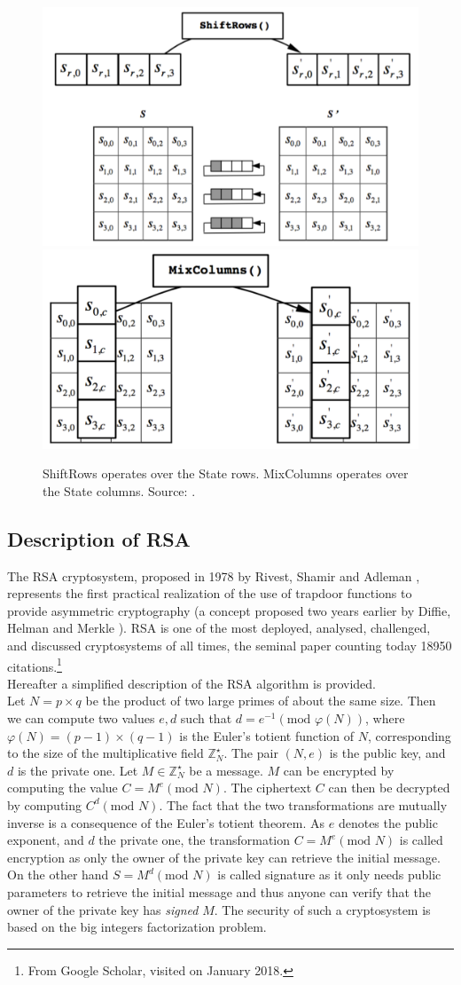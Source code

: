 \begin{figure}
\centering
\includegraphics[width = .45\textwidth]{../Figures/FISP_AES/shift_rows.pdf} 
\includegraphics[width = .45\textwidth]{../Figures/FISP_AES/mix_columns.pdf} 
\caption[ShiftRows and MixColumns.]{ShiftRows operates over the State rows. MixColumns operates over the State columns. Source: \cite{nist197}.}\label{fig:AES_sbox}
\end{figure}

\subsection{Description of RSA}
The RSA cryptosystem, proposed in 1978 by Rivest, Shamir and Adleman \cite{rivest1978method}, represents the first practical realization of the use of trapdoor functions to provide asymmetric cryptography (a concept proposed two years earlier by Diffie, Helman and Merkle \cite{diffie1976new}). RSA is one of the most deployed, analysed, challenged, and discussed cryptosystems of all times, the seminal paper \cite{rivest1978method} counting today 18950 citations.\footnote{From Google Scholar, visited on January 2018.}\\

Hereafter a simplified description of the RSA algorithm is provided.\\
Let $N = p \times q$ be the product of two large primes of about the same size. Then we can compute two values $e,d$ such that $d = e^{-1} (\mbox{mod } \varphi(N))$, where $\varphi(N) = (p-1)\times(q-1)$ is the Euler's totient function of $N$, corresponding to the size of the multiplicative field $	\mathbb{Z}^\star_N$. The pair $(N,e)$ is the public key, and $d$ is the private one. Let $M \in	\mathbb{Z}^\star_N$ be a message. $M$ can be encrypted by computing the value $C = M^e (\mbox{mod } N)$. The ciphertext $C$ can then be decrypted by computing $C^d (\mbox{mod } N)$. The fact that the two transformations are mutually inverse is a consequence of the Euler's totient theorem. 
As $e$ denotes the public exponent, and $d$ the private one, the transformation $C = M^e (\mbox{mod } N)$ is called encryption as only the owner of the private key can retrieve the initial message. On the other hand $S = M^d (\mbox{mod } N)$ is called signature as it only needs public parameters to retrieve the initial message and thus anyone can verify that the owner of the private key has \emph{signed} $M$. The security of such a cryptosystem is based on the big integers factorization problem.


